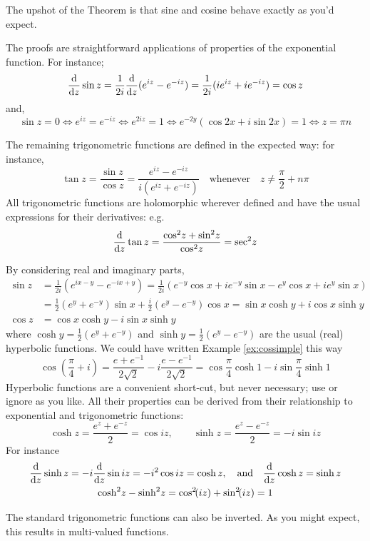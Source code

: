 The upshot of the Theorem is that sine and cosine behave exactly as you'd expect.\smallbreak

The proofs are straightforward applications of properties of the exponential function. For instance;
\[\frac{\mathrm{d} }{\mathrm{d} z}\sin z=\frac 1{2i}\frac{\mathrm{d} }{\mathrm{d} z}(e^{iz}-e^{-iz})=\frac 1{2i}(ie^{iz}+ie^{-iz})=\cos z\]
and,
\[\sin z=0\iff e^{iz}=e^{-iz}\iff e^{2iz}=1\iff e^{-2y}(\cos 2x+i\sin 2x)=1\iff z=\pi n\]


The remaining trigonometric functions are defined in the expected way: for instance,
\[\tan z=\frac{\sin z}{\cos z}=\frac{e^{iz}-e^{-iz}}{i(e^{iz}+e^{-iz})}\quad\text{whenever}\quad z\neq \frac\pi 2+n\pi\]
All trigonometric functions are holomorphic wherever defined and have the usual expressions for their derivatives: e.g.
\[\frac{\mathrm{d} }{\mathrm{d} z}\tan z=\frac{\cos^2\!z+\sin^2\!z}{\cos^2\!z}=\sec^2\!z\]

\begin{aside}

By considering real and imaginary parts, 
\begin{align*}
\sin z&=\frac 1{2i}(e^{ix-y}-e^{-ix+y})=\frac 1{2i}(e^{-y}\cos x+ie^{-y}\sin x-e^y\cos x+ie^y\sin x)\\
&=\frac 12(e^y+e^{-y})\sin x+\frac i2(e^y-e^{-y})\cos x = \sin x\cosh y+i\cos x\sinh y\\
\cos z&=\cos x\cosh y-i\sin x\sinh y
\end{align*}
where $\cosh y=\frac 12(e^y+e^{-y})$ and $\sinh y=\frac 12(e^y-e^{-y})$ are the usual (real) hyperbolic functions. We could have written Example \ref{ex:cossimple} this way
\[\cos\left(\frac\pi 4+i\right) =\frac{e+e^{-1}}{2\sqrt 2}-i\frac{e-e^{-1}}{2\sqrt 2} =\cos\frac\pi 4\cosh 1-i\sin\frac\pi 4\sinh 1\]
Hyperbolic functions are a convenient short-cut, but never necessary; use or ignore as you like. All their properties can be derived from their relationship to exponential and trigonometric functions:
\[\cosh z=\frac{e^z+e^{-z}}2=\cos iz,\qquad \sinh z=\frac{e^z-e^{-z}}2=-i\sin iz\]
For instance
\begin{gather*}
\frac{\mathrm{d} }{\mathrm{d} z}\sinh z=-i\frac{\mathrm{d} }{\mathrm{d} z}\sin iz=-i^2\cos iz=\cosh z,\quad\text{and}\quad\frac{\mathrm{d} }{\mathrm{d} z}\cosh z=\sinh z\\
\cosh^2\!z-\sinh^2\!z=\cos^2\!(iz)+\sin^2\!(iz)=1
\end{gather*}
\end{aside}



The standard trigonometric functions can also be inverted. As you might expect, this results in multi-valued functions.

